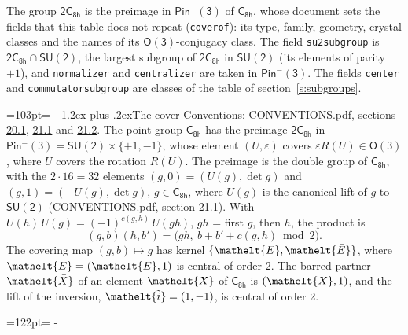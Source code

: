 \documentclass[10pt,a4paper]{article}
\makeatletter
\renewcommand\section{\@startsection{section}{1}{\z@}{-3ex plus -1ex minus -.2ex}%
  {1.2ex plus .2ex}{\normalfont\large\sffamily\bfseries\color{parttitle}}}
\newcommand{\needspace}[1]{\par\penalty-100\begingroup\dimen0=#1\relax\dimen2=\pagegoal
  \advance\dimen2-\pagetotal\ifdim\dimen0>\dimen2\relax\ifdim\dimen2>0pt\vfil\break\fi\fi
  \endgroup}
\numberwithin{equation}{section}
\newcommand{\eltfont}[1]{{\let\sigma\eltsigma\mathelt{#1}}}
\newcommand{\grp}[1]{\mathsf{#1}}
\newcommand{\elt}[1]{\eltfont{#1}}
\newcommand{\dirprod}{\times}
\newcommand{\barred}[1]{\bar{#1}}
\newcommand{\lift}[1]{\tilde{#1}}
\makeatother
\begin{document}
\leavevmode\label{n:element.inversion}\label{n:group.preimage}The group $\grp{2C_{8h}}$ is the preimage in $\grp{Pin^{-}(3)}$ of \href{../../../rotation/data/pdf/C8h.pdf}{$\grp{C_{8h}}$}, whose document sets the fields that this table does not repeat (\texttt{coverof}): its type, family, geometry, crystal classes and the names of its \href{../../../rotation/data/pdf/O3.pdf}{$\grp{O(3)}$}-conjugacy class. The field \texttt{su2subgroup} is $\grp{2C_{8h}} \cap \grp{SU(2)}$, the largest subgroup of $\grp{2C_{8h}}$ in $\grp{SU(2)}$ (its elements of parity $+1$), and \texttt{normalizer} and \texttt{centralizer} are taken in $\grp{Pin^{-}(3)}$. The fields \texttt{center} and \texttt{commutatorsubgroup} are classes of the table of section~\ref{s:subgroups}.
\needspace{103pt}
\section{The cover}\label{s:cover}
Conventions: \href{../../CONVENTIONS.pdf}{CONVENTIONS.pdf}, sections \href{../../CONVENTIONS.pdf\#conv.20.1}{20.1}, \href{../../CONVENTIONS.pdf\#conv.21.1}{21.1} and \href{../../CONVENTIONS.pdf\#conv.21.2}{21.2}.
\leavevmode\label{n:group.pin.minus}\label{n:group.su2}\label{n:local.pin.sign}\label{n:matrix.covered}\label{n:matrix.lift.su2}\label{n:index.bar}The point group $\grp{C_{8h}}$ has the preimage $\grp{2C_{8h}}$ in $\grp{Pin^{-}(3)} = \grp{SU(2)} \dirprod \{+1, -1\}$, whose element $(U, \varepsilon)$ covers $\varepsilon R(U) \in \grp{O(3)}$, where $U$ covers the rotation $R(U)$. The preimage is the double group of $\grp{C_{8h}}$, with the $2 \cdot 16 = 32$ elements $(g, 0) = (U(g), \det g)$ and $(g, 1) = (-U(g), \det g)$, $g \in \grp{C_{8h}}$, where $U(g)$ is the canonical lift of $g$ to $\grp{SU(2)}$ (\href{../../CONVENTIONS.pdf}{CONVENTIONS.pdf}, section \href{../../CONVENTIONS.pdf\#conv.21.1}{21.1}). \label{n:function.cocycle}With $U(h)\,U(g) = (-1)^{c(g,h)}\,U(gh)$, $gh$ = first $g$, then $h$, the product is
\begin{equation}\label{e:product}(g, b)(h, b') = \bigl(gh,\ b + b' + c(g, h) \bmod 2\bigr).\end{equation}
\leavevmode\label{n:mark.bar}The covering map $(g, b) \mapsto g$ has kernel $\{\elt{E}, \elt{\barred{E}}\}$, where $\elt{\barred{E}} = (\elt{E}, 1)$ is central of order 2. \label{n:element.named}\label{n:mark.lift}The barred partner $\elt{\barred{X}}$ of an element $\elt{X}$ of $\grp{C_{8h}}$ is $(\elt{X}, 1)$, and the lift of the inversion, $\elt{\lift{i}} = (1, -1)$, is central of order 2.
\needspace{122pt}
\end{document}
